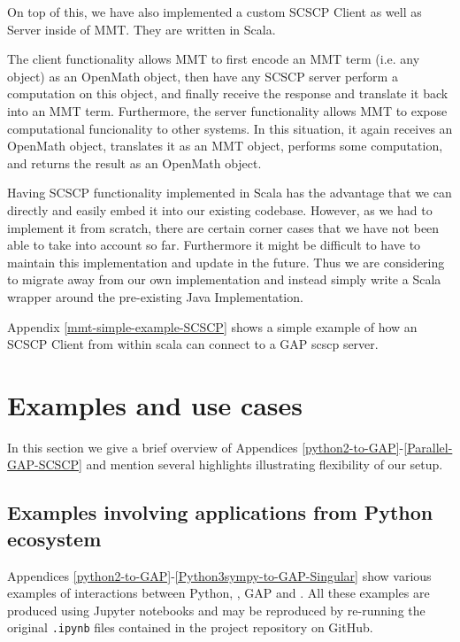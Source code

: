 \documentclass{deliverablereport}
\begin{document}
On top of this, we have also implemented a custom SCSCP Client as well as Server inside of MMT.
They are written in Scala.

The client functionality allows MMT to first encode an MMT term
(i.e. any object) as an OpenMath object, then have any SCSCP server
perform a computation on this object, and finally receive the response
and translate it back into an MMT term.  Furthermore, the server
functionality allows MMT to expose computational funcionality to other
systems.  In this situation, it again receives an OpenMath object,
translates it as an MMT object, performs some computation, and returns
the result as an OpenMath object.

Having SCSCP functionality implemented in Scala has the advantage
that we can directly and easily embed it into our existing codebase.
However, as we had to implement it from scratch, there are certain
corner cases that we have not been able to take into account so far.
Furthermore it might be difficult to have to maintain this
implementation and update in the future.  Thus we are considering to
migrate away from our own implementation and instead simply write a
Scala wrapper around the pre-existing Java Implementation.


Appendix \ref{mmt-simple-example-SCSCP} shows a simple example of how an SCSCP Client from within scala can connect to a GAP scscp server.  

\section{Examples and use cases}\label{examples}

In this section we give a brief overview of 
Appendices \ref{python2-to-GAP}-\ref{Parallel-GAP-SCSCP}
and mention several highlights illustrating flexibility of our setup.

\subsection{Examples involving applications from Python ecosystem}

Appendices \ref{python2-to-GAP}-\ref{Python3sympy-to-GAP-Singular}
show various examples of interactions between Python, \Sage, GAP 
and \Singular. All these examples are produced using Jupyter notebooks
and may be reproduced by re-running the original {\tt .ipynb} files
contained in the project repository on GitHub.
\end{document}
